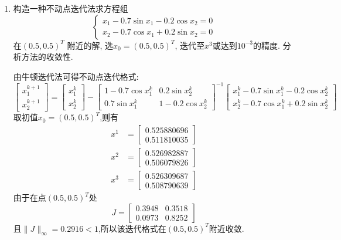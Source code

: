 \documentclass[a4paper]{article}
\begin{document}
\begin{enumerate}
  \item 构造一种不动点迭代法求方程组$$\begin{cases}
    x_{1}-0.7\sin x_{1}-0.2\cos x_{2}=0 \\
    x_{2}-0.7\cos x_{1}+0.2\sin x_{2}=0
  \end{cases}$$在$(0.5,0.5)^T$ 附近的解, 选$x_0=(0.5,0.5)^T$, 迭代至$x^3$或达到$10^{−3}$的精度. 分析方法的收敛性.
  \begin{solution}
    由牛顿迭代法可得不动点迭代格式:
    \[
    \begin{bmatrix}
      x_{1}^{k+1} \\
      x_{2}^{k+1}
    \end{bmatrix}=
    \begin{bmatrix}
      x_{1}^{k} \\
      x_{2}^{k}
    \end{bmatrix}-
    \begin{bmatrix}
      1-0.7\cos x_{1}^{k} & 0.2\sin x_{2}^{k} \\
      0.7\sin x_{1}^{k} & 1-0.2\cos x_{2}^{k}
    \end{bmatrix}^{-1}
    \begin{bmatrix}
      x_{1}^{k}-0.7\sin x_{1}^{k}-0.2\cos x_{2}^{k} \\
      x_{2}^{k}-0.7\cos x_{1}^{k}+0.2\sin x_{2}^{k}
    \end{bmatrix}
    \]
    取初值$x_{0}=(0.5,0.5)^{T}$,则有
    \begin{align*}
      x^{1}&=\begin{bmatrix}
        0.525880696\\
        0.511810035
      \end{bmatrix}\\
      x^{2}&=\begin{bmatrix}
        0.526982887\\
        0.506079826
      \end{bmatrix}\\
      x^{3}&=\begin{bmatrix}
        0.526309687\\
        0.508790639
      \end{bmatrix}
    \end{align*}
    由于在点$(0.5,0.5)^T$处
    \[
    J=\begin{bmatrix}
      0.3948 & 0.3518\\
      ​0.0973 & 0.8252​
    \end{bmatrix}
    \]
    且$\|J\|_{\infty}=0.2916<1$,所以该迭代格式在$(0.5,0.5)^T$附近收敛.
  \end{solution}
\end{enumerate}
\end{document}
